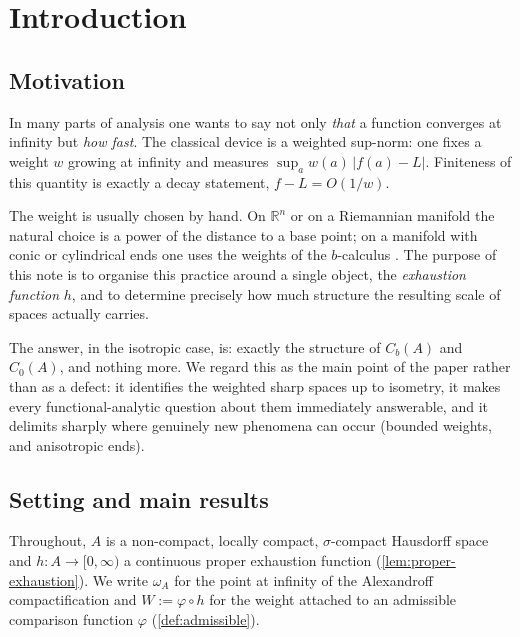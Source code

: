 \documentclass[11pt,a4paper]{article}
\numberwithin{equation}{section}
\theoremstyle{plain}
\theoremstyle{definition}
\theoremstyle{remark}
\newcommand{\R}{\mathbb{R}}
\newcommand{\wA}{\omega_A}
\newcommand{\Cb}{C_b}
\newcommand{\Cz}{C_0}
\begin{document}
\tableofcontents

\section{Introduction}
\label{sec:intro}

\subsection{Motivation}

In many parts of analysis one wants to say not only \emph{that} a function converges at
infinity but \emph{how fast}. The classical device is a weighted sup-norm: one fixes a
weight $w$ growing at infinity and measures $\sup_a w(a)\,|f(a)-L|$. Finiteness of this
quantity is exactly a decay statement, $f-L=O(1/w)$.

The weight is usually chosen by hand. On $\R^n$ or on a Riemannian manifold the natural
choice is a power of the distance to a base point; on a manifold with conic or cylindrical
ends one uses the weights of the $b$-calculus \cite{Melrose1993, Kondratev1967, Agmon1965}.
The purpose of this note is to organise this practice around a single object, the
\emph{exhaustion function} $h$, and to determine precisely how much structure the resulting
scale of spaces actually carries.

The answer, in the isotropic case, is: exactly the structure of $\Cb(A)$ and $\Cz(A)$, and
nothing more. We regard this as the main point of the paper rather than as a defect: it
identifies the weighted sharp spaces up to isometry, it makes every functional-analytic
question about them immediately answerable, and it delimits sharply where genuinely new
phenomena can occur (bounded weights, and anisotropic ends).

\subsection{Setting and main results}

Throughout, $A$ is a non-compact, locally compact, $\sigma$-compact Hausdorff space and
$h:A\to[0,\infty)$ a continuous proper exhaustion function (\cref{lem:proper-exhaustion}).
We write $\wA$ for the point at infinity of the Alexandroff compactification and
$W:=\varphi\circ h$ for the weight attached to an admissible comparison function $\varphi$
(\cref{def:admissible}).
\end{document}
